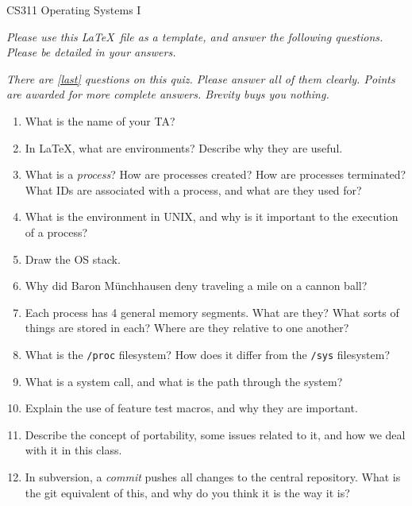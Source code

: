 \documentclass[letterpaper,10pt,onecolumn,titlepage]{article}
\begin{document}


{\Large CS311 Operating Systems I}

\emph{Please use this \LaTeX\ file as a template, and answer the following questions.
  Please be detailed in your answers.}

\emph{There are \ref{last} questions on this quiz. Please answer all of them clearly.
  Points are awarded for more complete answers. Brevity buys you nothing.}


\begin{enumerate}[itemsep=0.1 in]
\item What is the name of your TA?

\item In \LaTeX, what are environments? Describe why they are useful.

\item What is a \emph{process}? How are processes created? How are processes terminated?
  What IDs are associated with a process, and what are they used for?

\item What is the environment in UNIX, and why is it important to the execution of a
  process?

\item Draw the OS stack.

\item Why did Baron M\"unchhausen deny traveling a mile on a cannon ball? 

\item Each process has 4 general memory segments. What are they? What sorts of things are
  stored in each? Where are they relative to one another?

\item What is the \texttt{/proc} filesystem? How does it differ from the \texttt{/sys}
  filesystem?

\item What is a system call, and what is the path through the system?

\item Explain the use of feature test macros, and why they are important.

\item Describe the concept of portability, some issues related to it, and how we deal
  with it in this class.

\item In subversion, a \emph{commit} pushes all changes to the central repository. What
  is the git equivalent of this, and why do you think it is the way it is?


\end{enumerate}
\end{document}
